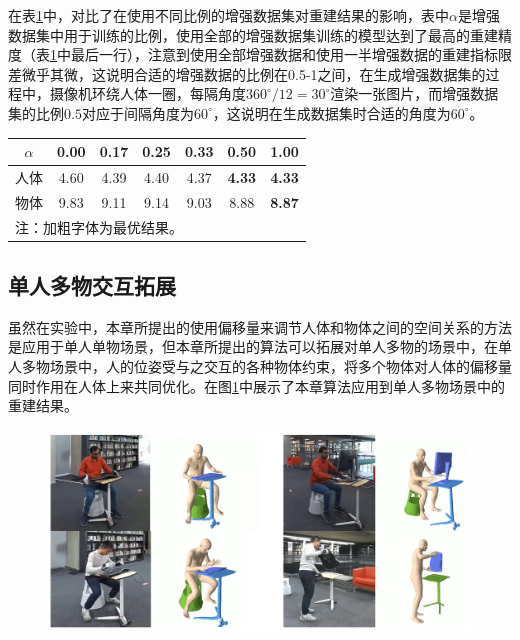 在表\ref{tab:ablation_augment}中，对比了在使用不同比例的增强数据集对重建结果的影响，表中$\alpha$是增强数据集中用于训练的比例，使用全部的增强数据集训练的模型达到了最高的重建精度（表\ref{tab:ablation_augment}中最后一行），注意到使用全部增强数据和使用一半增强数据的重建指标限差微乎其微，这说明合适的增强数据的比例在0.5-1之间，在生成增强数据集的过程中，摄像机环绕人体一圈，每隔角度$360^\circ / 12 = 30^\circ$渲染一张图片，而增强数据集的比例$0.5$对应于间隔角度为$60^\circ$，这说明在生成数据集时合适的角度为$60^\circ$。

\begin{table}[!htbp]
	\label{tab:ablation_augment}
	\centering
	\footnotesize
	\setlength{\tabcolsep}{4pt}
	\renewcommand{\arraystretch}{1.2}
	\begin{tabular}{c|cccccc}
		\toprule
		$\alpha$ & 0.00 & 0.17 & 0.25 & 0.33 & 0.50 & 1.00 \\
		\hline
		人体 & 4.60 & 4.39 & 4.40 & 4.37 & \textbf{4.33} & \textbf{4.33} \\
		物体 & 9.83 & 9.11 & 9.14 & 9.03 & 8.88 & \textbf{8.87} \\
		\bottomrule
		\multicolumn{6}{l}{注：加粗字体为最优结果。}
	\end{tabular}
\end{table}

\subsection{单人多物交互拓展}
虽然在实验中，本章所提出的使用偏移量来调节人体和物体之间的空间关系的方法是应用于单人单物场景，但本章所提出的算法可以拓展对单人多物的场景中，在单人多物场景中，人的位姿受与之交互的各种物体约束，将多个物体对人体的偏移量同时作用在人体上来共同优化。在图\ref{fig:stackflow_multi_object}中展示了本章算法应用到单人多物场景中的重建结果。

\begin{figure}[htbp]
	\centering
	\includegraphics{Img/stackflow_multi_object}
	\label{fig:stackflow_multi_object}
\end{figure}


